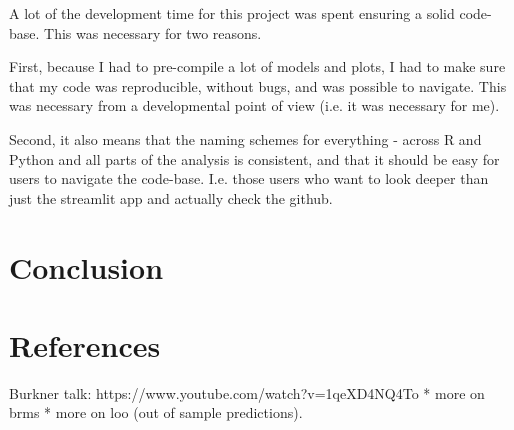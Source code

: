 \documentclass[12pt]{article}
\begin{document}
A lot of the development time for this project was spent ensuring a
solid code-base. This was necessary for two reasons.

First, because I had to pre-compile a lot of models and plots,
I had to make sure that my code was reproducible, without bugs,
and was possible to navigate. This was necessary from a developmental
point of view (i.e. it was necessary for me).

Second, it also means that the naming schemes for everything -
across R and Python and all parts of the analysis is consistent,
and that it should be easy for users to navigate the code-base.
I.e. those users who want to look deeper than just the streamlit app
and actually check the github.

\section{Conclusion}

\section{References}

Burkner talk: https://www.youtube.com/watch?v=1qeXD4NQ4To
* more on brms
* more on loo (out of sample predictions).

\printbibliography
\end{document}
